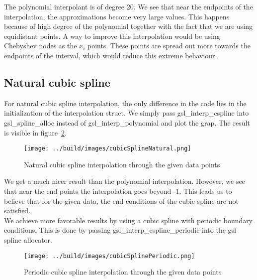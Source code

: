 \documentclass[11pt, a4paper, titlepage, openright]{article}
\begin{document}
    The polynomial interpolant is of degree 20. We see that near the endpoints of the interpolation, the approximations
    become very large values. This happens because of high degree of the polynomial together with the fact that
    we are using equidistant points.
    A way to improve this interpolation would be using Chebyshev nodes as the \( x_i \) points.
    These points are spread out more towards the endpoints of the interval, which would reduce this extreme behaviour.

\subsection{Natural cubic spline}
    For natural cubic spline interpolation, the only difference in the code lies in the initialization of the
    interpolation struct. We simply pass gsl\_interp\_cspline into gsl\_spline\_alloc instead of gsl\_interp\_polynomial
    and plot the grap. The result is visible in figure~\ref{fig:spline1}.
    \begin{figure}[H]
        \centering
        \texttt{[image: ../build/images/cubicSplineNatural.png]}
        \caption{Natural cubic spline interpolation through the given data points}
        \label{fig:spline1}
    \end{figure}
    We get a much nicer result than the polynomial interpolation.
    However, we see that near the end points the interpolation goes beyond -1.
    This leads us to believe that for the given data, the end conditions of the cubic spline are not satisfied. \\

    We achieve more favorable results by using a cubic spline with periodic boundary conditions. This is done by
    passing gsl\_interp\_cspline\_periodic into the gsl spline allocator.
    \begin{figure}[H]
        \centering
        \texttt{[image: ../build/images/cubicSplinePeriodic.png]}
        \caption{Periodic cubic spline interpolation through the given data points}
        \label{fig:spline1}
    \end{figure}
\end{document}

